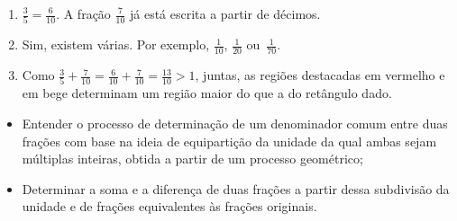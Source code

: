\begin{multicols}{2}
\begin{solucao}{}{}
\begin{enumerate} [\quad a)]
    \begin{center}
\end{center}

    \item             $\frac{3}{5} = \frac{6}{10}$. A fração       $\frac{7}{10}$       já está escrita a partir de décimos.
    \item       Sim, existem várias. Por exemplo,       $\frac{1}{10}$,       $\frac{1}{20}$       ou~$\frac{1}{70}$.
    \item       Como       $\frac{3}{5}+\frac{7}{10} = \frac{6}{10} + \frac{7}{10} = \frac{13}{10} > 1$, juntas, as regiões destacadas em vermelho e em bege determinam um região maior do que a do retângulo dado.
\end{enumerate} %


\end{solucao}

\begin{objetivos}[label=chap5-ativ6]{}{}

\begin{itemize} %
 \item  Entender o processo de determinação de um denominador comum entre duas frações com base na ideia de equipartição da unidade da qual ambas sejam múltiplas inteiras, obtida a partir de um processo geométrico;
  \item      Determinar a soma e a diferença de duas frações a partir dessa subdivisão da unidade e de frações equivalentes às frações originais.
\end{itemize} %
\end{objetivos}

\begin{orientacoes}{}{}


\end{orientacoes}
\end{multicols}
